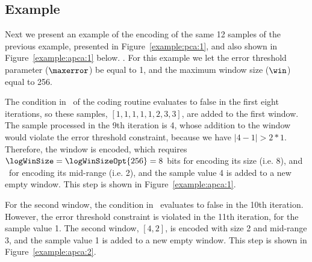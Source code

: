 




\vspace{-10pt}
\subsection{Example}
\label{algo:apca:example}
\newcommand{\APCACodeOne}{4}
\newcommand{\APCACodeTwo}{11}
\newcommand{\exampleIntroFirst}[1]{Next we present an example of the encoding of the same 12 samples of previous examples, presented in Figure~\ref{example:pca:1}, and also shown in Figure~#1 below}


Next we present an example of the encoding of the same 12 samples of the previous example, presented in Figure~\ref{example:pca:1}, and also shown in Figure~\ref{example:apca:1} below. . For this example we let the error threshold parameter ($\maxerror$) be equal to 1, and the maximum window size ($\win$) equal to 256. 


The condition in \Line \APCACodeOne\ of the coding routine evaluates to false in the first eight iterations, so these samples, $[1, 1, 1, 1, 1, 2, 3, 3]$, are added to the first window. The sample processed in the 9th iteration is 4, whose addition to the window would violate the error threshold constraint, because we have $|4 - 1| > 2*1$. Therefore, the window is encoded, which requires $\logWinSize = \logWinSizeOpt{256}=8$ bits for encoding its size (i.e. 8), and \tobitexp\ for encoding its mid-range (i.e. 2), and the sample value 4 is added to a new empty window. This step is shown in Figure~\ref{example:apca:1}.




For the second window, the condition in \Line \APCACodeOne\ evaluates to false in the 10th iteration. However, the error threshold constraint is violated in the 11th iteration, for the sample value 1. The second window, $[4, 2]$, is encoded with size 2 and mid-range 3, and the sample value 1 is added to a new empty window. This step is shown in Figure~\ref{example:apca:2}.




